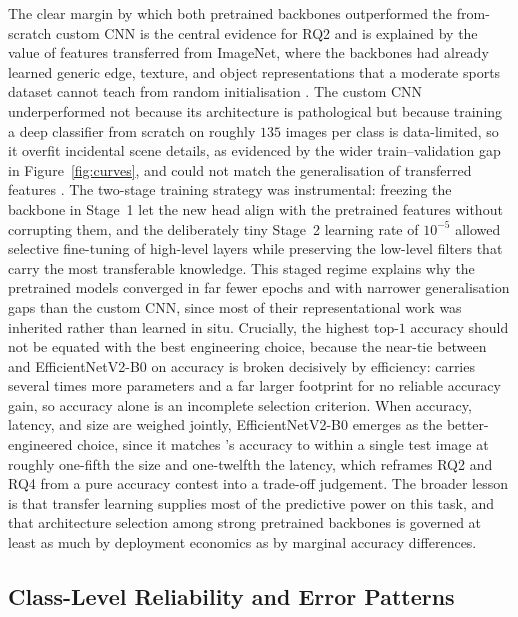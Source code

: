 The clear margin by which both pretrained backbones outperformed the from-scratch custom CNN is the central evidence for RQ2 and is explained by the value of features transferred from ImageNet, where the backbones had already learned generic edge, texture, and object representations that a moderate sports dataset cannot teach from random initialisation \citep{tan2021efficientnetv2,liu2022convnext}.
The custom CNN underperformed not because its architecture is pathological but because training a deep classifier from scratch on roughly $135$ images per class is data-limited, so it overfit incidental scene details, as evidenced by the wider train--validation gap in Figure~\ref{fig:curves}, and could not match the generalisation of transferred features \citep{he2016resnet}.
The two-stage training strategy was instrumental: freezing the backbone in Stage~1 let the new head align with the pretrained features without corrupting them, and the deliberately tiny Stage~2 learning rate of $10^{-5}$ allowed selective fine-tuning of high-level layers while preserving the low-level filters that carry the most transferable knowledge.
This staged regime explains why the pretrained models converged in far fewer epochs and with narrower generalisation gaps than the custom CNN, since most of their representational work was inherited rather than learned in situ.
Crucially, the highest top-$1$ accuracy should not be equated with the best engineering choice, because the near-tie between \bestModel{} and EfficientNetV2-B0 on accuracy is broken decisively by efficiency: \bestModel{} carries several times more parameters and a far larger footprint for no reliable accuracy gain, so accuracy alone is an incomplete selection criterion.
When accuracy, latency, and size are weighed jointly, EfficientNetV2-B0 emerges as the better-engineered choice, since it matches \bestModel{}'s accuracy to within a single test image at roughly one-fifth the size and one-twelfth the latency, which reframes RQ2 and RQ4 from a pure accuracy contest into a trade-off judgement.
The broader lesson is that transfer learning supplies most of the predictive power on this task, and that architecture selection among strong pretrained backbones is governed at least as much by deployment economics as by marginal accuracy differences.

\subsection{Class-Level Reliability and Error Patterns}
\label{subsec:disc-classerror}

